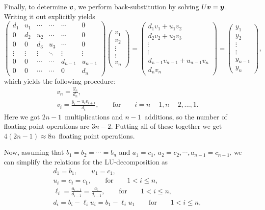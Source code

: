 \documentclass[english,notitlepage]{revtex4-1}  %
\begin{document}
Finally, to determine $\vb*{v}$, we perform back-substitution by solving $U\vb*{v} = \vb*{y}$. Writing it out explicitly yields 
\begin{equation}
	\begin{pmatrix}
	d_1 & u_1 & \cdots & \cdots &\cdots & 0 \\ 
	0 & d_2 & u_2 & \cdots & \cdots & 0 \\
	0 & 0 & d_3 & u_3 & \cdots & 0 \\
	\vdots & \vdots & \vdots & \ddots & \vdots & \vdots \\
	0 & 0 & \cdots & \cdots & d_{n-1} & u_{n-1} \\
	0 & 0 & \cdots & \cdots & 0 & d_n
	\end{pmatrix}
	\begin{pmatrix}
	v_1 \\ v_2 \\ \vdots \\ \vdots \\ v_n
	\end{pmatrix}
	= 
	\begin{pmatrix}
	d_1v_1 + u_1v_2 \\
	d_2v_2 + u_2v_3 \\ 
	\vdots \\ 
	\vdots \\
	d_{n-1}v_{n-1} + u_{n-1}v_n \\ 
	d_nv_n
	\end{pmatrix}
	=
	\begin{pmatrix}
	y_1 \\ y_2 \\ \vdots \\ \vdots \\ y_{n-1} \\ y_n 
	\end{pmatrix},
\end{equation}
which yields the following procedure: 
\begin{gather}
	v_n = \frac{y_n}{d_n}, \\
	v_i = \frac{y_i - u_iv_{i+1}}{d_i}, \qquad \text{for} \qquad i = n-1, n-2, ..., 1.
\end{gather}
Here we got $2n-1$ multiplications and $n-1$ additions, so the number of floating point operations are $3n-2$. Putting all of these together we get $4(2n-1) \approx 8n $ floating point operations.


Now, assuming that $b_1 = b_2 = \cdots = b_n$ and $a_1 = c_1$, $a_2 = c_2,  \cdots, a_{n-1} = c_{n-1}$, we can simplify the relations for the LU-decomposition as 
\begin{gather}
	d_1 = b_1, \qquad u_1 = c_1, \\
	u_i = c_i = c_1, \qquad \text{for} \qquad 1 < i \leq n,\\
	\ell_i = \frac{a_{i-1}}{d_{i-1}} = \frac{a_1}{d_{i-1}}, \qquad \text{for} \qquad 1 < i \leq n,\\
	d_i = b_i - \ell_iu_i = b_1 - \ell_iu_1 \qquad \text{for} \qquad 1 < i \leq n,
\end{gather}
\end{document}
